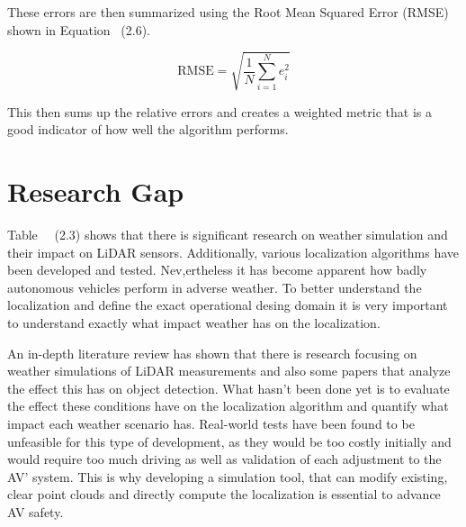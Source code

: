 These errors are then summarized using the Root Mean Squared Error (RMSE) shown in Equation ~(2.6). 

\begin{equation}
\mathrm{RMSE} = \sqrt{\frac{1}{N} \sum_{i=1}^{N} e_i^2}
\end{equation}

This then sums up the relative errors and creates a weighted metric that is a good indicator of how well the algorithm performs. 
\section{Research Gap }

Table~ ~(2.3) shows that there is significant research on weather simulation and their impact on LiDAR sensors. 
Additionally, various localization algorithms have been developed and tested. 
Nev,ertheless it has become apparent how badly autonomous vehicles perform in adverse weather. To better understand the localization and define the exact operational desing domain it is very important to understand exactly what impact weather has on the localization. 

An in-depth literature review has shown that there is research focusing on weather simulations of LiDAR measurements and also some papers that analyze the effect this has on object detection. What hasn't been done yet is to evaluate the effect these conditions have on the localization algorithm and quantify what impact each weather scenario has. Real-world tests have been found to be unfeasible for this type of development, as they would be too costly initially and would require too much driving as well as validation of each adjustment to the AV' system\cite{kalra_driving_2016}. This is why developing a simulation tool, that can modify existing, clear point clouds and directly compute the localization is essential to advance AV safety. 

